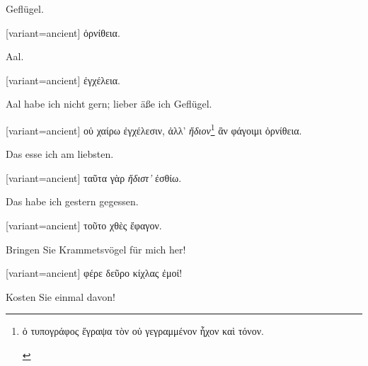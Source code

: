 Geflügel. 

\egroup\switchcolumn\bgroup

\begin{greek}[variant=ancient]%
ὀρνίθεια.

\end{greek}%
\egroup\myafterpagefalse\switchcolumn*\bgroup

Aal. 

\egroup\switchcolumn\bgroup

\begin{greek}[variant=ancient]%
ἐγχέλεια.

\end{greek}%
\egroup\switchcolumn*

Aal habe ich nicht gern; lieber äße ich Geflügel.

\switchcolumn

\begin{greek}[variant=ancient]%
οὐ χαίρω ἐγχέλεσιν, ἀλλ' \emph{ἥδιον}\footnote{\begin{latin}%
\textgreek[variant=ancient]{ὁ τυπογράφος ἔγραψα τὸν οὐ γεγραμμένον
ἦχον καὶ τόνον.}\end{latin}%
} ἂν φάγοιμι ὀρνίθεια.

\end{greek}%
\switchcolumn*

Das esse ich am liebsten.

\switchcolumn

\begin{greek}[variant=ancient]%
ταῦτα γὰρ \emph{ἥδιστ'} ἐσθίω.

\end{greek}%
\switchcolumn*

Das habe ich gestern gegessen.

\switchcolumn

\begin{greek}[variant=ancient]%
τοῦτο χθὲς ἔφαγον.

\end{greek}%
\switchcolumn*

Bringen Sie Krammets\textcompwordmark{}vögel für mich her!

\switchcolumn

\begin{greek}[variant=ancient]%
φέρε δεῦρο κίχλας ἐμοί!

\end{greek}%
\switchcolumn*

Kosten Sie einmal davon!

